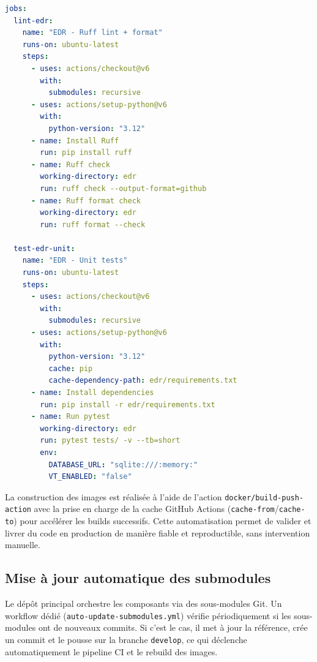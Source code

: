 \begin{lstlisting}[language=yaml, caption={Extrait du pipeline CI -- tests unitaires EDR}, label={lst:ci-edr-tests}]
jobs:
  lint-edr:
    name: "EDR - Ruff lint + format"
    runs-on: ubuntu-latest
    steps:
      - uses: actions/checkout@v6
        with:
          submodules: recursive
      - uses: actions/setup-python@v6
        with:
          python-version: "3.12"
      - name: Install Ruff
        run: pip install ruff
      - name: Ruff check
        working-directory: edr
        run: ruff check --output-format=github
      - name: Ruff format check
        working-directory: edr
        run: ruff format --check

  test-edr-unit:
    name: "EDR - Unit tests"
    runs-on: ubuntu-latest
    steps:
      - uses: actions/checkout@v6
        with:
          submodules: recursive
      - uses: actions/setup-python@v6
        with:
          python-version: "3.12"
          cache: pip
          cache-dependency-path: edr/requirements.txt
      - name: Install dependencies
        run: pip install -r edr/requirements.txt
      - name: Run pytest
        working-directory: edr
        run: pytest tests/ -v --tb=short
        env:
          DATABASE_URL: "sqlite:///:memory:"
          VT_ENABLED: "false"
\end{lstlisting}

La construction des images est réalisée à l'aide de l'action
\texttt{docker/build-push-action} avec la prise en charge de la cache
GitHub Actions (\texttt{cache-from}/\texttt{cache-to}) pour accélérer les
builds successifs. Cette automatisation permet de valider et livrer du code en production de manière fiable et reproductible, sans intervention manuelle.

\subsection{Mise à jour automatique des submodules}

Le dépôt principal orchestre les composants via des sous-modules Git. Un
workflow dédié (\texttt{auto-update-submodules.yml}) vérifie périodiquement
si les sous-modules ont de nouveaux commits. Si c'est le cas, il met à jour
la référence, crée un commit et le pousse sur la branche \texttt{develop}, ce
qui déclenche automatiquement le pipeline CI et le rebuild des images.

